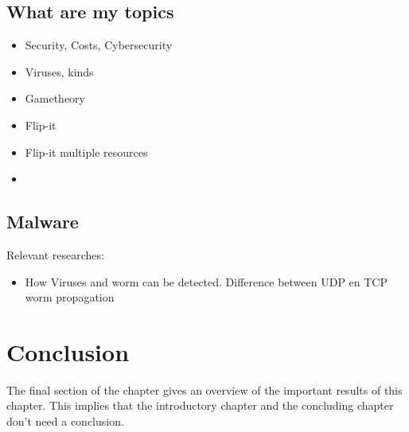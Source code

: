 

\subsection{What are my topics}
\begin{itemize}
\item Security, Costs, Cybersecurity
\item Viruses, kinds
\item Gametheory
\item Flip-it
\item Flip-it multiple resources
\item 
\end{itemize}

\subsection{Malware}
Relevant researches:
\begin{itemize}
\item How Viruses and worm can be detected. Difference between UDP en TCP worm propagation
\end{itemize}






\section{Conclusion}
The final section of the chapter gives an overview of the important results
of this chapter. This implies that the introductory chapter and the
concluding chapter don't need a conclusion.



%
